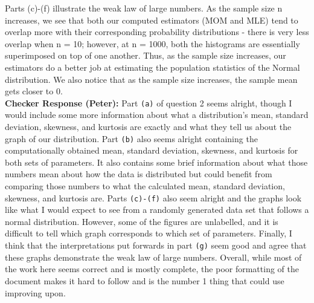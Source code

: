 \documentclass{article}\usepackage[]{graphicx}\usepackage[]{color}
\begin{document}
\begin{enumerate}
\begin{enumerate}
  Parts (c)-(f) illustrate the weak law of large numbers. As the sample size n increases, we see that both our computed estimators (MOM and MLE) tend to overlap more with their corresponding probability distributions - there is very less overlap when n = 10; however, at n = 1000, both the histograms are essentially superimposed on top of one another. Thus, as the sample size increases, our estimators do a better job at estimating the population statistics of the Normal distribution. We also notice that as the sample size increases, the sample mean gets closer to 0.\\
  \textbf{Checker Response (Peter):} Part \texttt{(a)} of question 2 seems alright, though I would include some more information about what a distribution’s mean, standard deviation, skewness, and kurtosis are exactly and what they tell us about the graph of our distribution. Part \texttt{(b)} also seems alright containing the computationally obtained mean, standard deviation, skewness, and kurtosis for both sets of parameters. It also contains some brief information about what those numbers mean about how the data is distributed but could benefit from comparing those numbers to what the calculated mean, standard deviation, skewness, and kurtosis are. Parts \texttt{(c)-(f)} also seem alright and the graphs look like what I would expect to see from a randomly generated data set that follows a normal distribution. However, some of the figures are unlabelled, and it is difficult to tell which graph corresponds to which set of parameters. Finally, I think that the interpretations put forwards in part \texttt{(g)} seem good and agree that these graphs demonstrate the weak law of large numbers. Overall, while most of the work here seems correct and is mostly complete, the poor formatting of the document makes it hard to follow and is the number 1 thing that could use improving upon.
  

\end{enumerate}
\end{enumerate}
\end{document}
